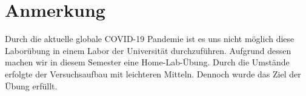\section*{Anmerkung}
\label{sec:anmerkung}
Durch die aktuelle globale COVID-19 Pandemie ist es uns nicht möglich diese Laborübung in einem Labor der Universität durchzuführen.
Aufgrund dessen machen wir in diesem Semester eine Home-Lab-Übung.
Durch die Umstände erfolgte der Versuchsaufbau mit leichteren Mitteln. Dennoch wurde das Ziel der Übung erfüllt.